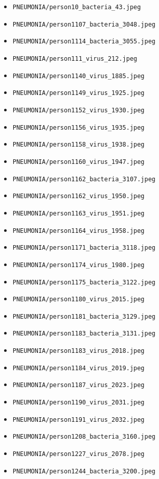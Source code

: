 \begin{itemize}
\item \texttt{PNEUMONIA/person10\_bacteria\_43.jpeg}
\item \texttt{PNEUMONIA/person1107\_bacteria\_3048.jpeg}
\item \texttt{PNEUMONIA/person1114\_bacteria\_3055.jpeg}
\item \texttt{PNEUMONIA/person111\_virus\_212.jpeg}
\item \texttt{PNEUMONIA/person1140\_virus\_1885.jpeg}
\item \texttt{PNEUMONIA/person1149\_virus\_1925.jpeg}
\item \texttt{PNEUMONIA/person1152\_virus\_1930.jpeg}
\item \texttt{PNEUMONIA/person1156\_virus\_1935.jpeg}
\item \texttt{PNEUMONIA/person1158\_virus\_1938.jpeg}
\item \texttt{PNEUMONIA/person1160\_virus\_1947.jpeg}
\item \texttt{PNEUMONIA/person1162\_bacteria\_3107.jpeg}
\item \texttt{PNEUMONIA/person1162\_virus\_1950.jpeg}
\item \texttt{PNEUMONIA/person1163\_virus\_1951.jpeg}
\item \texttt{PNEUMONIA/person1164\_virus\_1958.jpeg}
\item \texttt{PNEUMONIA/person1171\_bacteria\_3118.jpeg}
\item \texttt{PNEUMONIA/person1174\_virus\_1980.jpeg}
\item \texttt{PNEUMONIA/person1175\_bacteria\_3122.jpeg}
\item \texttt{PNEUMONIA/person1180\_virus\_2015.jpeg}
\item \texttt{PNEUMONIA/person1181\_bacteria\_3129.jpeg}
\item \texttt{PNEUMONIA/person1183\_bacteria\_3131.jpeg}
\item \texttt{PNEUMONIA/person1183\_virus\_2018.jpeg}
\item \texttt{PNEUMONIA/person1184\_virus\_2019.jpeg}
\item \texttt{PNEUMONIA/person1187\_virus\_2023.jpeg}
\item \texttt{PNEUMONIA/person1190\_virus\_2031.jpeg}
\item \texttt{PNEUMONIA/person1191\_virus\_2032.jpeg}
\item \texttt{PNEUMONIA/person1208\_bacteria\_3160.jpeg}
\item \texttt{PNEUMONIA/person1227\_virus\_2078.jpeg}
\item \texttt{PNEUMONIA/person1244\_bacteria\_3200.jpeg}

\end{itemize}
